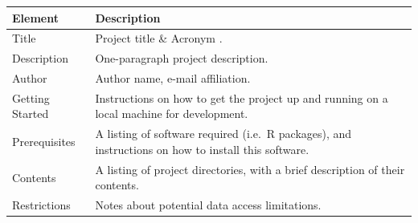 \documentclass[]{book}
\begin{document}
\begin{longtable}[]{@{}ll@{}}
\toprule
\begin{minipage}[b]{0.22\columnwidth}\raggedright\strut
Element\strut
\end{minipage} & \begin{minipage}[b]{0.51\columnwidth}\raggedright\strut
Description\strut
\end{minipage}\tabularnewline
\midrule
\endhead
\begin{minipage}[t]{0.22\columnwidth}\raggedright\strut
Title\strut
\end{minipage} & \begin{minipage}[t]{0.51\columnwidth}\raggedright\strut
Project title \& Acronym .\strut
\end{minipage}\tabularnewline
\begin{minipage}[t]{0.22\columnwidth}\raggedright\strut
Description\strut
\end{minipage} & \begin{minipage}[t]{0.51\columnwidth}\raggedright\strut
One-paragraph project description.\strut
\end{minipage}\tabularnewline
\begin{minipage}[t]{0.22\columnwidth}\raggedright\strut
Author\strut
\end{minipage} & \begin{minipage}[t]{0.51\columnwidth}\raggedright\strut
Author name, e-mail affiliation.\strut
\end{minipage}\tabularnewline
\begin{minipage}[t]{0.22\columnwidth}\raggedright\strut
Getting Started\strut
\end{minipage} & \begin{minipage}[t]{0.51\columnwidth}\raggedright\strut
Instructions on how to get the project up and running on a local machine
for development.\strut
\end{minipage}\tabularnewline
\begin{minipage}[t]{0.22\columnwidth}\raggedright\strut
Prerequisites\strut
\end{minipage} & \begin{minipage}[t]{0.51\columnwidth}\raggedright\strut
A listing of software required (i.e.~R packages), and instructions on
how to install this software.\strut
\end{minipage}\tabularnewline
\begin{minipage}[t]{0.22\columnwidth}\raggedright\strut
Contents\strut
\end{minipage} & \begin{minipage}[t]{0.51\columnwidth}\raggedright\strut
A listing of project directories, with a brief description of their
contents.\strut
\end{minipage}\tabularnewline
\begin{minipage}[t]{0.22\columnwidth}\raggedright\strut
Restrictions\strut
\end{minipage} & \begin{minipage}[t]{0.51\columnwidth}\raggedright\strut
Notes about potential data access limitations.\strut
\end{minipage}\tabularnewline
\bottomrule
\end{longtable}
\end{document}

